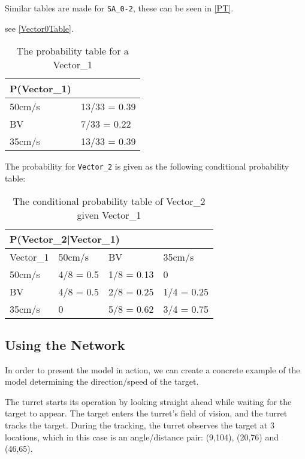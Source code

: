 Similar tables are made for \texttt{SA\_0-2}, these can be seen in \autoref{PT}.





 see \autoref{Vector0Table}. 

\begin{center}
\begin{table}[H]
\begin{tabular}{|l|l|}
\hline
P(Vector\_1) &\\ \hline
50cm/s & 13/33 = 0.39   \\ \hline 
BV & 7/33 = 0.22  \\ \hline
35cm/s & 13/33 = 0.39  \\ \hline
\end{tabular}
\caption{The probability table for a Vector\_1}
\label{Vector0Table}
\end{table}
\end{center}

The probability for \texttt{Vector\_2} is given as the following conditional
probability table: 
\begin{table}[]
\centering
\begin{tabular}{|l|l|l|l|}
\hline
\multicolumn{4}{|l|}{P(Vector\_2|Vector\_1)} \\ \hline
 Vector\_1 & 50cm/s    & BV    & 35cm/s    \\ \hline
 50cm/s    & 4/8 = 0.5    & 1/8 = 0.13    & 0    \\ \hline
 BV   & 4/8 = 0.5    & 2/8 = 0.25    & 1/4 = 0.25  \\ \hline
 35cm/s    & 0            & 5/8 = 0.62    & 3/4 = 0.75  \\ \hline
\end{tabular}
\caption{The conditional probability table of Vector\_2 given Vector\_1}
\label{vector2tab} 
\end{table}



\subsection{Using the Network}
In order to present the model in action, we can create a concrete example of the
model determining the direction/speed of the target.\nl

The turret starts its operation by looking straight ahead while waiting for the
target to appear. The target enters the turret's field of vision, and the turret
tracks the target. During the tracking, the turret observes the target at 3
locations, which in this case is an angle/distance pair: (9,104), (20,76) and
(46,65).\nl

